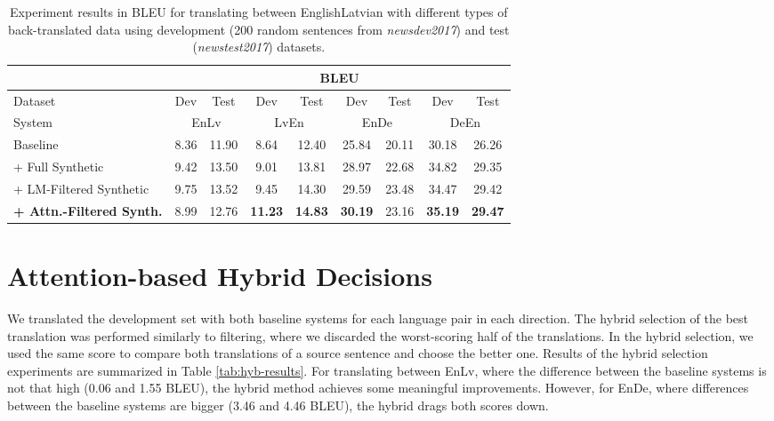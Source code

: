 \documentclass[]{article}
\begin{document}
\begin{table}[h]
  \begin{center}
    \begin{tabular}{|l|c|c|c|c|c|c|c|c|}
      \hline 
       & \multicolumn{8}{|c|}{BLEU} \\ 
      \hline 
      Dataset & Dev & Test  & Dev & Test & Dev & Test  & Dev & Test \\ 
      \hline 
      System & \multicolumn{2}{|c|}{EnLv}  & \multicolumn{2}{|c|}{LvEn} & \multicolumn{2}{|c|}{EnDe}  & \multicolumn{2}{|c|}{DeEn} \\ 
      \hline
      Baseline 							& 8.36 	& 11.90 	& 8.64 		& 12.40 	& 25.84 & 20.11 & 30.18 & 26.26 \\
      + Full Synthetic 					& 9.42 	& 13.50 	& 9.01 		& 13.81 	& 28.97 & 22.68 & 34.82 & 29.35 \\
      + LM-Filtered Synthetic 			& 9.75 	& 13.52 	& 9.45 		& 14.30 	& 29.59 & 23.48 & 34.47 & 29.42 \\
      \bf + Attn.-Filtered Synth. 		& 8.99 	& 12.76 	& \bf11.23 	& \bf14.83 	& \bf30.19 & 23.16 & \bf35.19 & \bf29.47 \\
      \hline
    \end{tabular}
  \end{center}
  \caption{Experiment results in BLEU for translating between EnglishLatvian with different types of back-translated data using development (200 random sentences from \textit{newsdev2017}) and test (\textit{newstest2017}) datasets.}
  \label{tab:lv-fil-results}
\end{table}

\iffalse
\begin{figure*}[h]
  \texttt{[image: Figures/Distributions.PNG]}
  \caption{Distributions of different attention scoring metrics.}
  \label{fig:score-distributions}
\end{figure*}
\fi

\FloatBarrier

\section{Attention-based Hybrid Decisions}
\label{sctHybrid}

We translated the development set with both baseline systems for each language pair in each direction. The hybrid selection of the best translation was performed similarly to filtering, where we discarded the worst-scoring half of the translations. In the hybrid selection, we used the same score to compare both translations of a source sentence and choose the better one. Results of the hybrid selection experiments are summarized in Table \ref{tab:hyb-results}. For translating between EnLv, where the difference between the baseline systems is not that high (0.06 and 1.55 BLEU), the hybrid method achieves some meaningful improvements. However, for EnDe, where differences between the baseline systems are bigger (3.46 and 4.46 BLEU), the hybrid drags both scores down.  
\end{document}
